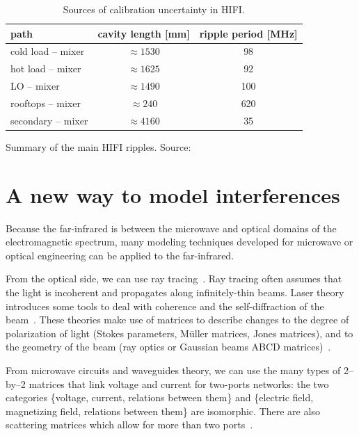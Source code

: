 \begin{table}
    \bigskip
    \begin{subtable}{\linewidth}
    \centering
    \begin{tabular}{lcc}
        \toprule
            path & cavity length [\si{\milli\meter}] & ripple period [\si{\mega\hertz}]\\
        \midrule
            cold load -- mixer & $\approx\num{1530}$ &  98\\
            hot load -- mixer  & $\approx\num{1625}$ &  92\\
            LO -- mixer        & $\approx\num{1490}$ & 100\\
            rooftops -- mixer  & $\approx\num{ 240}$ & 620\\
            secondary -- mixer & $\approx\num{4160}$ &  35\\
        \bottomrule
    \end{tabular}
    \caption{
        Summary of the main HIFI ripples.
        Source:~\textcite{risacher2011standingwaves}
    }
    \label{tab:ripple_periods}
    \end{subtable}
    \caption{Sources of calibration uncertainty in HIFI.}
\end{table}



\section{A new way to model interferences}
\label{sec:new_interference_model}

Because the far-infrared is between the microwave and optical domains of the electromagnetic spectrum, many modeling techniques developed for microwave or optical engineering can be applied to the far-infrared.

From the optical side, we can use ray tracing~\autocite{spencer1962general}.
Ray tracing often assumes that the light is incoherent and propagates along infinitely-thin beams.
Laser theory introduces some tools to deal with coherence and the self-diffraction of the beam~\autocite{siegman1986lasers}.
These theories make use of matrices to describe changes to the degree of polarization of light (Stokes parameters, Müller matrices, Jones matrices), and to the geometry of the beam (ray optics or Gaussian beams ABCD matrices)~\autocite{goldsmith1998quasioptical}.

From microwave circuits and waveguides theory, we can use the many types of 2--by--2 matrices that link voltage and current for two-ports networks:
the two categories \{voltage, current, relations between them\} and \{electric field, magnetizing field, relations between them\} are isomorphic.
There are also scattering matrices which allow for more than two ports~\autocite{pozar2009microwave}.

